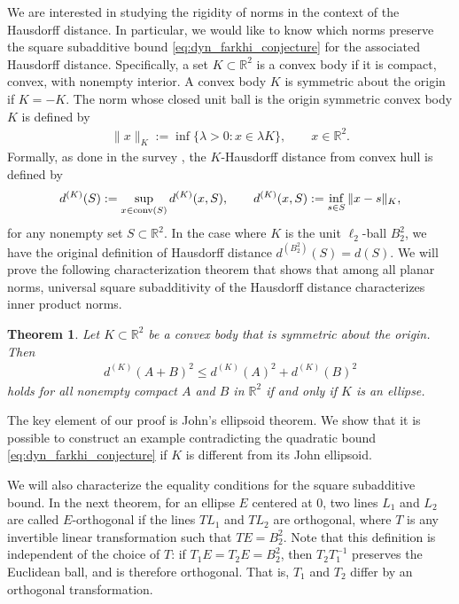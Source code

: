 \documentclass[11pt]{article}
\newtheorem{theorem}{Theorem}[section]
\begin{document}
We are interested in studying the rigidity of norms in the context of the Hausdorff distance. In particular, we would like to know which norms preserve the square subadditive bound \eqref{eq:dyn_farkhi_conjecture} for the associated Hausdorff distance. Specifically, a set $K\subset\mathbb{R}^2$ is a convex body if it is compact, convex, with nonempty interior. A convex body $K$ is symmetric about the origin if $K=-K$. The norm whose closed unit ball is the origin symmetric convex body $K$ is defined by
\begin{align*}
    \|x\|_K:=\inf\{\lambda>0:x\in \lambda K\},\qquad x\in \mathbb{R}^2.
\end{align*}
Formally, as done in the survey \cite{fradelizi1}, the $K$-Hausdorff distance from convex hull is defined by
\begin{align*}
    d^{(K)}(S):=\sup_{x\in \textup{conv}(S)}d^{(K)}(x,S),\qquad d^{(K)}(x,S):=\inf_{s\in S}\|x-s\|_K,
\end{align*}
for any nonempty set $S\subset\mathbb{R}^2$. In the case where $K$ is the unit $\ell_2$-ball $B_2^2$, we have the original definition of Hausdorff distance $d^{(B_2^2)}(S)=d(S)$. We will prove the following characterization theorem that shows that among all planar norms, universal square subadditivity of the Hausdorff distance characterizes inner product norms.

\begin{theorem}\label{theorem:norm_rigidity_theorem}
    Let $K\subset \mathbb{R}^2$ be a convex body that is symmetric about the origin. Then
    \begin{align*}
        d^{(K)}(A+B)^2\leq d^{(K)}(A)^2+d^{(K)}(B)^2
    \end{align*}
    holds for all nonempty compact $A$ and $B$ in $\mathbb{R}^2$ if and only if $K$ is an ellipse.
\end{theorem}

The key element of our proof is John's ellipsoid theorem. We show that it is possible to construct an example contradicting the quadratic bound \eqref{eq:dyn_farkhi_conjecture} if $K$ is different from its John ellipsoid.

We will also characterize the equality conditions for the square subadditive bound. In the next theorem, for an ellipse $E$ centered at $0$, two lines $L_1$ and $L_2$ are called $E$-orthogonal if the lines $TL_1$ and $TL_2$ are orthogonal, where $T$ is any invertible linear transformation such that $TE=B_2^2$. Note that this definition is independent of the choice of $T$: if $T_1E=T_2E=B_2^2$, then $T_2T_1^{-1}$ preserves the Euclidean ball, and is therefore orthogonal. That is, $T_1$ and $T_2$ differ by an orthogonal transformation.
\end{document}
